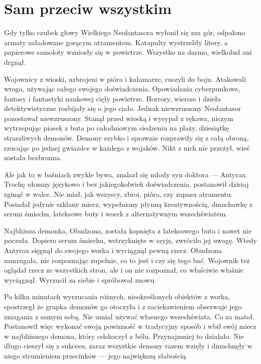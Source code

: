 \chapter{Sam przeciw wszystkim}


Gdy tylko czubek głowy Wielkiego Neofantasora wyłonił się zza gór, odpalono armaty załadowane gorącym atramentem.
Katapulty wystrzeliły litery, a papierowe samoloty wzniosły się w powietrze.
Wszystko na darmo, wielkolud ani drgnął.

Wojownicy z wioski, uzbrojeni w pióra i kałamarze, ruszyli do boju.
Atakowali wroga, używając całego swojego doświadczenia. Opowiadania cyberpunkowe, fantasy i fantastyki naukowej cięły powietrze.
Horrory, wiersze i dzieła detektywistyczne rozbijały się o jego ciało.
Jednak niewzruszony Neofantasor pozostawał niewzruszony.
Stanął przed wioską i wysypał z rękawa, niczym wytrzepując piasek z buta po całodniowym siedzeniu na plaży, dziesiątkę straszliwych demonów.
Demony szybko i sprawnie rozprawiły się z całą obroną, rzucając po jednej gwiazdce w każdego z wojaków.
Nikt z nich nie przeżył, wieś została bezbronna.

Ale jak to w baśniach zwykle bywa, znalazł się młody syn doktora --- Antyrax.
Trochę ułomny językowo i bez jakiegokolwiek doświadczenia, postanowił dzisiaj zginąć w walce.
Nie miał, jak wszyscy, zbroi, pióra, czy zapasu atramentu.
Posiadał jedynie szklany miecz, wypełniony płynną kreatywnością, dmuchawkę z serum śmiechu, lateksowe buty i worek z alternatywnym wszechświatem.

Najbliższa demonka, Obudzona, została kopnięta z lateksowego buta i nawet nie poczuła.
Dopiero serum śmiechu, wstrzyknięte w szyję, zwróciło jej uwagę.
Wtedy Antyrax sięgnął do swojego worka i wyciągnął pewną rzecz.
Obudzona zamrugała, nie rozpoznając zupełnie, co to jest i czy się tego bać.
Wojownik też oglądał rzecz ze wszystkich stron, ale i on nie rozpoznał, co właściwie właśnie wyciągnął.
Wyrzucił za siebie i spróbował znowu.

Po kilku minutach wyrzucania różnych, nieokreślonych obiektów z worka, spostrzegł że grupka demonów go otoczyła i z zaciekawieniem obserwuje jego zmagania z samym sobą.
Nie umiał używać własnego wszechświata. Co za matoł.
Postanowił więc wykonać swoją powinność w tradycyjny sposób i wbił swój miecz w najbliższego demona, który odskoczył z bólu. Przynajmniej to działało.
Nie długo cieszył się z sukcesu, zaraz wszystkie demony razem wzięły i dmuchnęły w niego strumieniem przecinków --- jego największą słabością.

